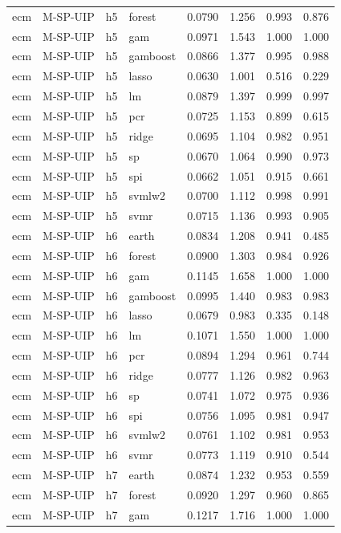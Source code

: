\begin{ThreePartTable}
\begin{longtable}[t]{llclcccc}
ecm & M-SP-UIP & h5 & forest & 0.0790 & 1.256 & 0.993 & 0.876\\
ecm & M-SP-UIP & h5 & gam & 0.0971 & 1.543 & 1.000 & 1.000\\
ecm & M-SP-UIP & h5 & gamboost & 0.0866 & 1.377 & 0.995 & 0.988\\
ecm & M-SP-UIP & h5 & lasso & 0.0630 & 1.001 & 0.516 & 0.229\\
ecm & M-SP-UIP & h5 & lm & 0.0879 & 1.397 & 0.999 & 0.997\\
ecm & M-SP-UIP & h5 & pcr & 0.0725 & 1.153 & 0.899 & 0.615\\
ecm & M-SP-UIP & h5 & ridge & 0.0695 & 1.104 & 0.982 & 0.951\\
ecm & M-SP-UIP & h5 & sp & 0.0670 & 1.064 & 0.990 & 0.973\\
ecm & M-SP-UIP & h5 & spi & 0.0662 & 1.051 & 0.915 & 0.661\\
ecm & M-SP-UIP & h5 & svmlw2 & 0.0700 & 1.112 & 0.998 & 0.991\\
ecm & M-SP-UIP & h5 & svmr & 0.0715 & 1.136 & 0.993 & 0.905\\
\addlinespace
ecm & M-SP-UIP & h6 & earth & 0.0834 & 1.208 & 0.941 & 0.485\\
ecm & M-SP-UIP & h6 & forest & 0.0900 & 1.303 & 0.984 & 0.926\\
ecm & M-SP-UIP & h6 & gam & 0.1145 & 1.658 & 1.000 & 1.000\\
ecm & M-SP-UIP & h6 & gamboost & 0.0995 & 1.440 & 0.983 & 0.983\\
ecm & M-SP-UIP & h6 & lasso & 0.0679 & 0.983 & 0.335 & 0.148\\
ecm & M-SP-UIP & h6 & lm & 0.1071 & 1.550 & 1.000 & 1.000\\
ecm & M-SP-UIP & h6 & pcr & 0.0894 & 1.294 & 0.961 & 0.744\\
ecm & M-SP-UIP & h6 & ridge & 0.0777 & 1.126 & 0.982 & 0.963\\
ecm & M-SP-UIP & h6 & sp & 0.0741 & 1.072 & 0.975 & 0.936\\
ecm & M-SP-UIP & h6 & spi & 0.0756 & 1.095 & 0.981 & 0.947\\
ecm & M-SP-UIP & h6 & svmlw2 & 0.0761 & 1.102 & 0.981 & 0.953\\
ecm & M-SP-UIP & h6 & svmr & 0.0773 & 1.119 & 0.910 & 0.544\\
\addlinespace
ecm & M-SP-UIP & h7 & earth & 0.0874 & 1.232 & 0.953 & 0.559\\
ecm & M-SP-UIP & h7 & forest & 0.0920 & 1.297 & 0.960 & 0.865\\
ecm & M-SP-UIP & h7 & gam & 0.1217 & 1.716 & 1.000 & 1.000\\

\end{longtable}
\end{ThreePartTable}
